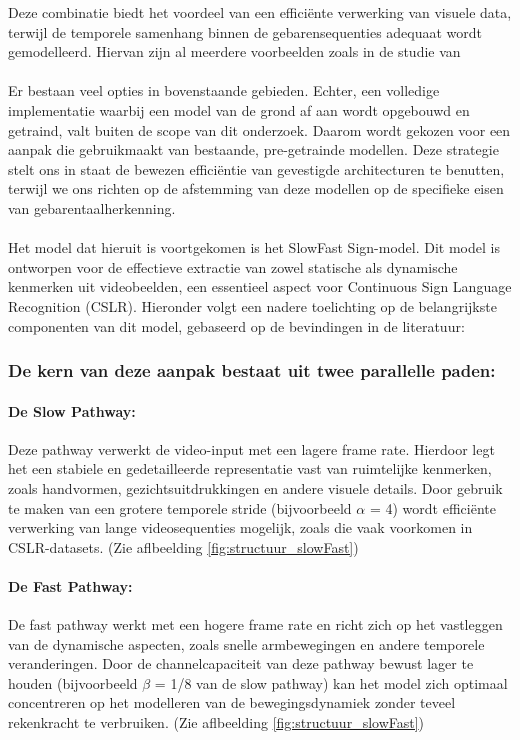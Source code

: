 Deze combinatie biedt het voordeel van een efficiënte verwerking van visuele data, terwijl de temporele samenhang binnen de gebarensequenties adequaat wordt gemodelleerd.
Hiervan zijn al meerdere voorbeelden zoals in de studie van \textcite{Wang2022}
\\
\\
Er bestaan veel opties in bovenstaande gebieden. 
Echter, een volledige implementatie waarbij een model van de grond af aan wordt opgebouwd en getraind, valt buiten de scope van dit onderzoek. 
Daarom wordt gekozen voor een aanpak die gebruikmaakt van bestaande, pre-getrainde modellen. 
Deze strategie stelt ons in staat de bewezen efficiëntie van gevestigde architecturen te benutten, terwijl we ons richten op de afstemming van deze modellen op de specifieke eisen van gebarentaalherkenning.
\\
\\
Het model dat hieruit is voortgekomen is het SlowFast Sign-model. 
Dit model is ontworpen voor de effectieve extractie van zowel statische als dynamische kenmerken uit videobeelden, een essentieel aspect voor Continuous Sign Language Recognition (CSLR). 
Hieronder volgt een nadere toelichting op de belangrijkste componenten van dit model, gebaseerd op de bevindingen in de literatuur:

\subsubsection{De kern van deze aanpak bestaat uit twee parallelle paden:}
\paragraph{De Slow Pathway:}
Deze pathway verwerkt de video-input met een lagere frame rate. 
Hierdoor legt het een stabiele en gedetailleerde representatie vast van ruimtelijke kenmerken, zoals handvormen, gezichtsuitdrukkingen en andere visuele details. 
Door gebruik te maken van een grotere temporele stride (bijvoorbeeld $\alpha$ = 4) wordt efficiënte verwerking van lange videosequenties mogelijk, zoals die vaak voorkomen in CSLR-datasets.
(Zie aflbeelding \ref{fig:structuur_slowFast})

\paragraph{De Fast Pathway:}
De fast pathway werkt met een hogere frame rate en richt zich op het vastleggen van de dynamische aspecten, zoals snelle armbewegingen en andere temporele veranderingen. 
Door de channelcapaciteit van deze pathway bewust lager te houden (bijvoorbeeld $\beta$ = 1/8 van de slow pathway) kan het model zich optimaal concentreren op het modelleren van de bewegingsdynamiek zonder teveel rekenkracht te verbruiken.
(Zie aflbeelding \ref{fig:structuur_slowFast})

